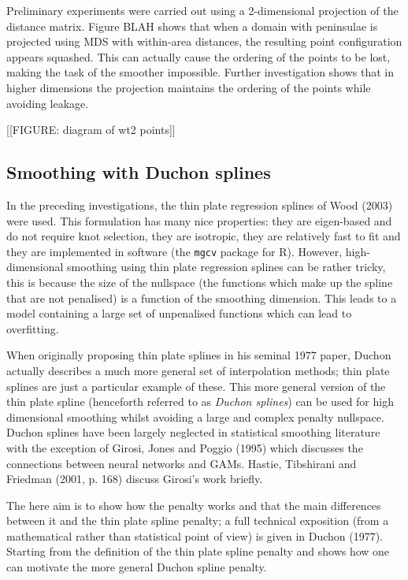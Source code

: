 \documentclass[useAMS,referee, usegraphicx]{biom}
\begin{document}
Preliminary experiments were carried out using a 2-dimensional projection of the distance matrix. Figure BLAH shows that when a domain with peninsulae is projected using MDS with within-area distances, the resulting point configuration appears squashed. This can actually cause the ordering of the points to be lost, making the task of the smoother impossible. Further investigation shows that in higher dimensions the projection maintains the ordering of the points while avoiding leakage.

[[FIGURE: diagram of wt2 points]]

\subsection{Smoothing with Duchon splines}

In the preceding investigations, the thin plate regression splines of Wood (2003) were used. This formulation has many nice properties: they are eigen-based and do not require knot selection, they are isotropic, they are relatively fast to fit and they are implemented in software (the \texttt{mgcv} package for \textsf{R}). However, high-dimensional smoothing using thin plate regression splines can be rather tricky, this is because the size of the nullspace (the functions which make up the spline that are not penalised) is a function of the smoothing dimension. This leads to a model containing a large set of unpenalised functions which can lead to overfitting.

When originally proposing thin plate splines in his seminal 1977 paper, Duchon actually describes a much more general set of interpolation methods; thin plate splines are just a particular example of these. This more general version of the thin plate spline (henceforth referred to as \textit{Duchon splines}) can be used for high dimensional smoothing whilst avoiding a large and complex penalty nullspace. Duchon splines have been largely neglected in statistical smoothing literature with the exception of Girosi, Jones and Poggio (1995) which discusses the connections between neural networks and GAMs. Hastie, Tibshirani and Friedman (2001, p. 168) discuss Girosi's work briefly.

The here aim is to show how the penalty works and that the main differences between it and the thin plate spline penalty; a full technical exposition (from a mathematical rather than statistical point of view) is given in Duchon (1977). Starting from the definition of the thin plate spline penalty and shows how one can motivate the more general Duchon spline penalty. 
\end{document}

